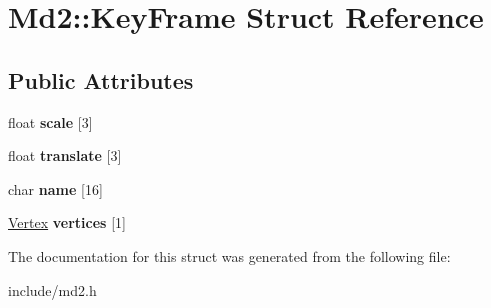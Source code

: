 \hypertarget{structMd2_1_1KeyFrame}{\section{Md2\-:\-:Key\-Frame Struct Reference}
\label{structMd2_1_1KeyFrame}
}
\subsection*{Public Attributes}
\begin{DoxyCompactItemize}
\item 
\hypertarget{structMd2_1_1KeyFrame_a5c8c01faac967a3b5b858a13937bb544}{float {\bfseries scale} \mbox{[}3\mbox{]}}\label{structMd2_1_1KeyFrame_a5c8c01faac967a3b5b858a13937bb544}

\item 
\hypertarget{structMd2_1_1KeyFrame_a796c6f283829879af82021e9221297b8}{float {\bfseries translate} \mbox{[}3\mbox{]}}\label{structMd2_1_1KeyFrame_a796c6f283829879af82021e9221297b8}

\item 
\hypertarget{structMd2_1_1KeyFrame_af2aaf24cb9a75235fc60c0a6f148717e}{char {\bfseries name} \mbox{[}16\mbox{]}}\label{structMd2_1_1KeyFrame_af2aaf24cb9a75235fc60c0a6f148717e}

\item 
\hypertarget{structMd2_1_1KeyFrame_a8642cde75887a156501afaf0762df573}{\hyperlink{structMd2_1_1Vertex}{Vertex} {\bfseries vertices} \mbox{[}1\mbox{]}}\label{structMd2_1_1KeyFrame_a8642cde75887a156501afaf0762df573}

\end{DoxyCompactItemize}


The documentation for this struct was generated from the following file\-:\begin{DoxyCompactItemize}
\item 
include/md2.\-h\end{DoxyCompactItemize}

